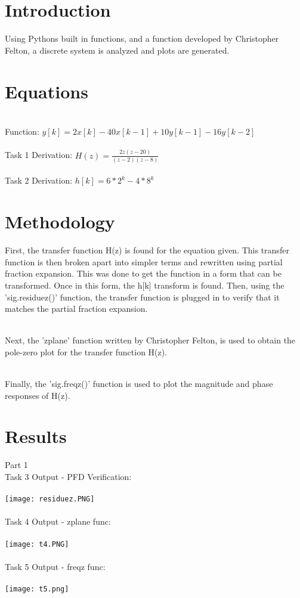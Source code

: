 \documentclass[12pt]{report}
\begin{document}
\section{Introduction}
Using Pythons built in functions, and a function developed by Christopher Felton, a discrete system is analyzed and plots are generated.

\section{Equations}
\\Function: $y[k] = 2x[k] - 40x[k-1] + 10y[k-1] - 16y[k-2]$
\\
\\Task 1 Derivation: $H(z) = \frac{2z(z-20)}{(z-2)(z-8)}$
\\
\\Task 2 Derivation: $h[k] = 6*2^k - 4*8^k$


\section{Methodology}
First, the transfer function H(z) is found for the equation given. This transfer function is then broken apart into simpler terms and rewritten using partial fraction expansion. This was done to get the function in a form that can be transformed. Once in this form, the h[k] transform is found. Then, using the 'sig.residuez()' function, the transfer function is plugged in to verify that it matches the partial fraction expansion.

\\Next, the 'zplane' function written by Christopher Felton, is used to obtain the pole-zero plot for the transfer function H(z). 

\\Finally, the 'sig.freqz()' function is used to plot the magnitude and phase responses of H(z).


\section{Results}
Part 1
\\Task 3 Output - PFD Verification:
\\
\\ \texttt{[image: residuez.PNG]}
\\
\\ Task 4 Output - zplane func:
\\
\\ \texttt{[image: t4.PNG]}
\\
\\ Task 5 Output - freqz func:
\\
\\ \texttt{[image: t5.png]}
\end{document}
